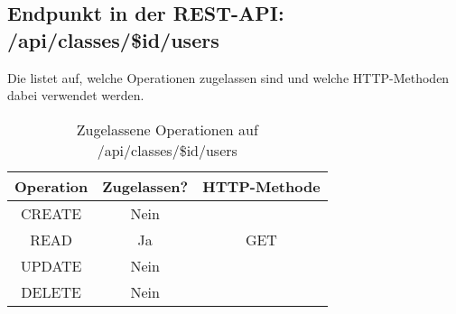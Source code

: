 \subsection{Endpunkt in der REST-API: /api/classes/\$id/users}
Die  listet auf, welche Operationen zugelassen sind und welche HTTP-Methoden dabei verwendet werden. 


\begin{table}[!htbp]
	\begin{tabular}{|c|c|c|}
		\hline
			\textbf{Operation} & \textbf{Zugelassen?} & \textbf{HTTP-Methode} \\ \hline
			CREATE & Nein & \\ \hline 
			READ & Ja & GET \\ \hline
			UPDATE & Nein & \\ \hline 
			DELETE & Nein & \\ \hline
	\end{tabular}

		\caption{Zugelassene Operationen auf /api/classes/\$id/users}
		\label{tab:rest:api:classes:id:users:meth}
\end{table}

